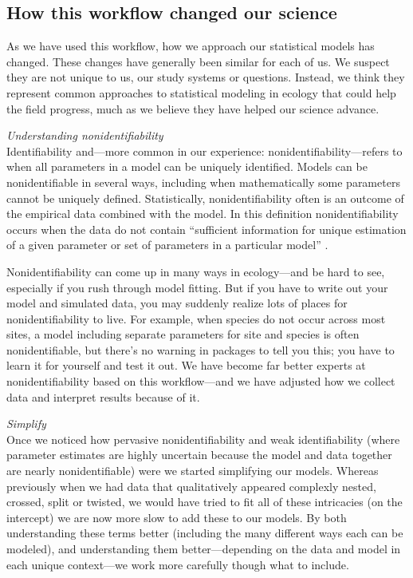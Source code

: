 \documentclass[11pt]{article}
\begin{document}
\subsection{How this workflow changed our science} %

As we have used this workflow, how we approach our statistical models has changed. These changes have generally been similar for each of us. We suspect they are not unique to us, our study systems or questions. Instead, we think they represent common approaches to statistical modeling in ecology that could help the field progress, much as we believe they have helped our science advance. 

 \emph{Understanding nonidentifiability} \\
Identifiability and---more common in our experience: nonidentifiability---refers to when all parameters in a model can be uniquely identified. Models can be nonidentifiable in several ways, including when mathematically some parameters cannot be uniquely defined. Statistically, nonidentifiability often is an outcome of the empirical data combined with the model. In this definition nonidentifiability occurs when the data do not contain ``sufficient information for unique estimation of a given parameter or set of parameters in a particular model'' \citep{gelmanhill}. 

Nonidentifiability can come up in many ways in ecology---and be hard to see, especially if you rush through model fitting. But if you have to write out your model and simulated data, you may suddenly realize lots of places for nonidentifiability to live. For example, when species do not occur across most sites, a model including separate parameters for site and species is often nonidentifiable, but there's no warning in packages to tell you this; you have to learn it for yourself and test it out. We have become far better experts at nonidentifiability based on this workflow---and we have adjusted how we collect data and interpret results because of it. 

 \emph{Simplify} \\
Once we noticed how pervasive nonidentifiability and weak identifiability (where parameter estimates are highly uncertain because the model and data together are nearly nonidentifiable) were we started simplifying our models. Whereas previously when we had data that qualitatively appeared complexly nested, crossed, split or twisted, we would have tried to fit all of these intricacies (on the intercept) we are now more slow to add these to our models. By both understanding these terms better (including the many different ways each can be modeled), and understanding them better---depending on the data and model in each unique context---we work more carefully though what to include.
\end{document}

